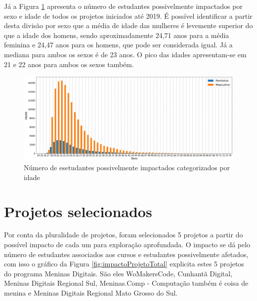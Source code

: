Já a Figura \ref{fig:idadeProjetos} apresenta o número de estudantes possivelmente impactados por sexo e idade de todos os projetos iniciados até 2019. É possível identificar a partir desta divisão por sexo que a média de idade das mulheres é levemente superior do que a idade dos homens, sendo aproximadamente 24,71 anos para a média feminina e 24,47 anos para os homens, que pode ser considerada igual. Já a mediana para ambos os sexos é de 23 anos. O pico das idades apresentam-se em 21 e 22 anos para ambos os sexos também.


\begin{figure}[H]
\centering
\includegraphics[width=1\textwidth]{Figuras/idadeProjetos.png}
\caption{Número de esetudantes possivelmente impactados categorizados por idade}
\label{fig:idadeProjetos}
\end{figure}










\section{Projetos selecionados}\label{sec:ProjetosEscolhidos}

Por conta da pluralidade de projetos, foram selecionados 5 projetos a partir do possível impacto de cada um para exploração aprofundada. O impacto se dá pelo número de estudantes associados aos cursos e estudantes possivelmente afetados, com isso o gráfico da Figura \ref{fig:impactoProjetoTotal} explicita estes 5 projetos do programa Meninas Digitais. São eles WoMakersCode, Cunhantã Digital, Meninas Digitais Regional Sul, Meninas.Comp - Computação também é coisa de menina e Meninas Digitais Regional Mato Grosso do Sul.


